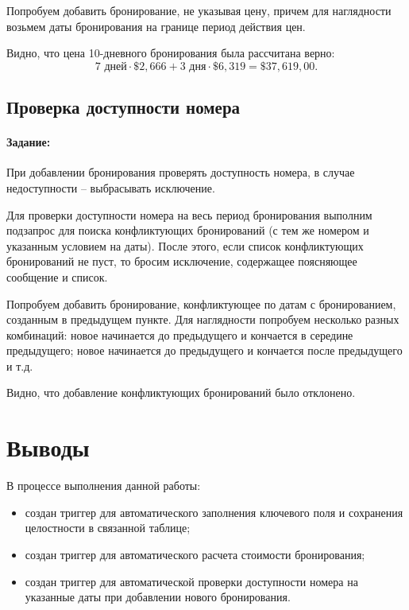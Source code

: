 

Попробуем добавить бронирование, не указывая цену, причем для наглядности возьмем даты бронирования на границе период действия цен.



Видно, что цена 10-дневного бронирования была рассчитана верно: 
\vspace{-0.5em}
\begin{displaymath}
7\text{ дней} \cdot \$2,666 + 3\text{ дня} \cdot \$6,319 = \$37,619,00.
\end{displaymath}

\subsection{Проверка доступности номера}

\paragraph{Задание:} При добавлении бронирования проверять доступность номера, в случае недоступности -- выбрасывать исключение.

Для проверки доступности номера на весь период бронирования выполним подзапрос для поиска конфликтующих бронирований (с тем же номером и указанным условием на даты). После этого, если список конфликтующих бронирований не пуст, то бросим исключение, содержащее поясняющее сообщение и список.



Попробуем добавить бронирование, конфликтующее по датам с бронированием, созданным в предыдущем пункте. Для наглядности попробуем несколько разных комбинаций: новое начинается до предыдущего и кончается в середине предыдущего; новое начинается до предыдущего и кончается после предыдущего и т.д.



Видно, что добавление конфликтующих бронирований было отклонено.

\vspace{-1em}
\section{Выводы}

В процессе выполнения данной работы:

\begin{itemize}
	\item создан триггер для автоматического заполнения ключевого поля и сохранения целостности в связанной таблице;
	\item создан триггер для автоматического расчета стоимости бронирования;
	\item создан триггер для автоматической проверки доступности номера на указанные даты при добавлении нового бронирования.
\end{itemize}



